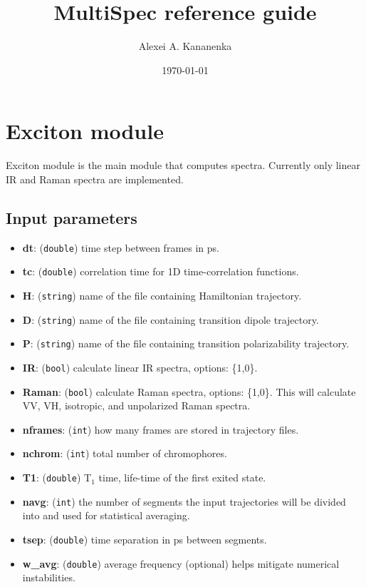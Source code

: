 \documentclass{article}
\begin{document}
\title{MultiSpec reference guide}
\author{Alexei A. Kananenka}
\date{\today}
\maketitle

\section{Exciton module}
Exciton module is the main module that computes spectra. Currently only linear IR and Raman spectra are implemented.

\subsection{Input parameters}

\begin{itemize}
\item \textbf{dt}: (\texttt{double}) time step between frames in ps.
\item \textbf{tc}: (\texttt{double}) correlation time for 1D time-correlation functions.
\item \textbf{H}: (\texttt{string}) name of the file containing Hamiltonian trajectory. 
\item \textbf{D}: (\texttt{string}) name of the file containing transition dipole trajectory. 
\item \textbf{P}: (\texttt{string}) name of the file containing transition polarizability trajectory. 
\item \textbf{IR}: (\texttt{bool}) calculate linear IR spectra, options: \{1,0\}.
\item \textbf{Raman}: (\texttt{bool}) calculate Raman spectra, options: \{1,0\}. This will calculate VV, VH, isotropic, and unpolarized Raman spectra.
\item \textbf{nframes}: (\texttt{int}) how many frames are stored in trajectory files.
\item \textbf{nchrom}: (\texttt{int}) total number of chromophores.
\item \textbf{T1}: (\texttt{double}) T$_1$ time, life-time of the first exited state.
\item \textbf{navg}: (\texttt{int}) the number of segments the input trajectories will be divided into and used for statistical averaging.
\item \textbf{tsep}: (\texttt{double}) time separation in ps between segments.
\item \textbf{w\_avg}: (\texttt{double}) average frequency (optional) helps mitigate numerical instabilities.

\end{itemize}
\end{document}
